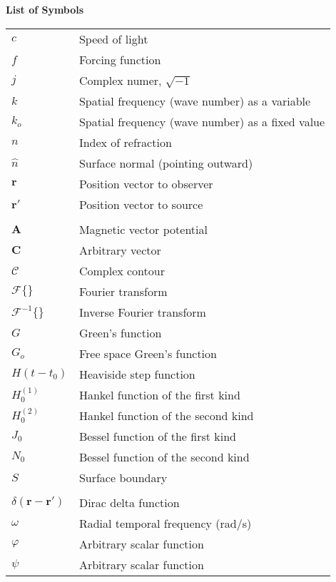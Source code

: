 \noindent\Large{\bf{List of Symbols}}

\vspace{24pt}

\small\normalsize
\begin{supertabular}{ll}
$c$ & Speed of light \\
$f$ & Forcing function \\
$j$ & Complex numer, $\sqrt{-1}$ \\
$k$ & Spatial frequency (wave number) as a variable\\
$k_o$ & Spatial frequency (wave number) as a fixed value \\
$n$ & Index of refraction \\
$\hat{n}$ & Surface normal (pointing outward) \\
$\mathbf{r}$ & Position vector to observer \\
$\mathbf{r}'$ & Position vector to source \\
\\
$\mathbf{A}$ & Magnetic vector potential \\
$\mathbf{C}$ & Arbitrary vector \\
$\mathcal{C}$ & Complex contour \\
$\mathcal{F}\{\}$ & Fourier transform \\
$\mathcal{F}^{-1}\{\}$ & Inverse Fourier transform \\
$G$ & Green's function \\
$G_o$ & Free space Green's function \\
$H(t-t_0)$ & Heaviside step function \\
$H_0^{(1)}$ & Hankel function of the first kind \\
$H_0^{(2)}$ & Hankel function of the second kind \\
$J_0$ & Bessel function of the first kind \\
$N_0$ & Bessel function of the second kind \\
$S$ & Surface boundary \\
\\
$\delta\left(\mathbf{r}-\mathbf{r}' \right)$ & Dirac delta function \\
$\omega$ & Radial temporal frequency (rad/s)\\
$\varphi$ & Arbitrary scalar function\\
$\psi$ & Arbitrary scalar function\\
\end{supertabular}